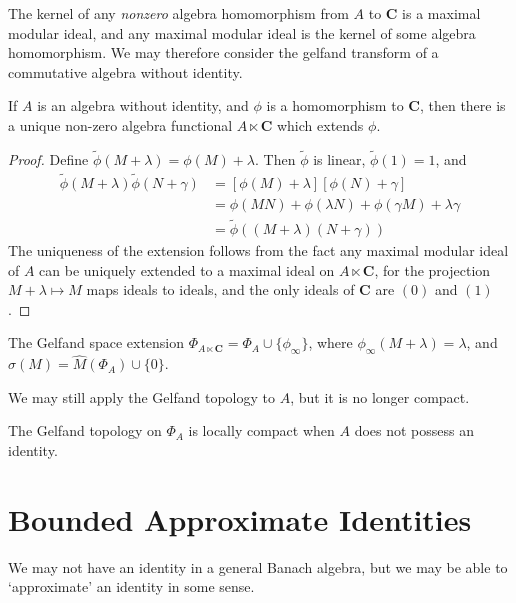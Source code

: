 The kernel of any {\it nonzero} algebra homomorphism from $A$ to $\mathbf{C}$ is a maximal modular ideal, and any maximal modular ideal is the kernel of some algebra homomorphism.  We may therefore consider the gelfand transform of a commutative algebra without identity.

\begin{lemma}
    If $A$ is an algebra without identity, and $\phi$ is a homomorphism to $\mathbf{C}$, then there is a unique non-zero algebra functional $A \ltimes \mathbf{C}$ which extends $\phi$.
\end{lemma}
\begin{proof}
    Define $\tilde{\phi}(M + \lambda) = \phi(M) + \lambda$. Then $\tilde{\phi}$ is linear, $\tilde{\phi}(1) = 1$, and
    \begin{align*}
        \tilde{\phi}(M + \lambda) \tilde{\phi}(N + \gamma) &= [\phi(M) + \lambda][\phi(N) + \gamma]\\
        &= \phi(MN) + \phi(\lambda N) + \phi(\gamma M) + \lambda \gamma\\
        &= \tilde{\phi}((M + \lambda)(N + \gamma))
    \end{align*}
    The uniqueness of the extension follows from the fact any maximal modular ideal of $A$ can be uniquely extended to a maximal ideal on $A \ltimes \mathbf{C}$, for the projection $M + \lambda \mapsto M$ maps ideals to ideals, and the only ideals of $\mathbf{C}$ are $(0)$ and $(1)$.
\end{proof}

\begin{corollary}
    The Gelfand space extension $\Phi_{A \ltimes \mathbf{C}} = \Phi_A \cup \{ \phi_\infty \}$, where $\phi_\infty(M + \lambda) = \lambda$, and $\sigma(M) = \widehat{M}(\Phi_{A}) \cup \{ 0 \}$.
\end{corollary}

We may still apply the Gelfand topology to $A$, but it is no longer compact.

\begin{theorem}
    The Gelfand topology on $\Phi_A$ is locally compact when $A$ does not possess an identity.
\end{theorem}

\section{Bounded Approximate Identities}

We may not have an identity in a general Banach algebra, but we may be able to `approximate' an identity in some sense.

